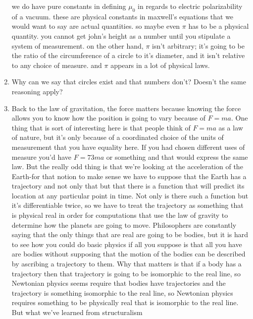 \documentclass[12pt]{article}
\theoremstyle{definition}
\begin{document}
\begin{enumerate}
        we do have pure constants in defining $\mu_0$ in regards to electric
        polarizability of a vacuum. these are physical constants in maxwell's
        equations that we would want to say are actual quantities. so maybe
        even $\pi$ has to be a physical quantity. you cannot get john's height
        as a number until you stipulate a system of measurement. on the other
        hand, $\pi$ isn't arbitrary; it's going to be the ratio of the
        circumference of a circle to it's diameter, and it isn't relative to any
        choice of measure. and $\pi$ appears in a lot of physical laws. 
    \item
        Why can we say that circles exist and that numbers don't? Doesn't the
        same reasoning apply?
    \item
        Back to the law of gravitation, the force matters because knowing the
        force allows you to know how the position is going to vary because of
        $F = ma$. One thing that is sort of interesting here is that people
        think of $F = ma$ as a law of nature, but it's only because of a
        coordinated choice of the units of measurement that you have equality
        here. If you had chosen different uses of measure you'd have $F = 73ma$
        or something and that would express the same law. But the really odd
        thing is that we're looking at the acceleration of the Earth-for that
        notion to make sense we have to suppose that the Earth has a trajectory
        and not only that but that there is a function that will predict its
        location at any particular point in time. Not only is there such a
        function but it's differentiable twice, so we have to treat the
        trajectory as something that is physical real in order for computations
        that use the law of gravity to determine how the planets are going to
        move. Philosophers are constantly saying that the only things that are
        real are going to be bodies, but it is hard to see how you could do
        basic physics if all you suppose is that all you have are bodies
        without supposing that the motion of the bodies can be described by
        ascribing a trajectory to them. Why that matters is that if a body has
        a trajectory then that trajectory is going to be isomorphic to the real
        line, so Newtonian physics seems require that bodies have trajectories
        and the trajectory is something isomorphic to the real line, so
        Newtonian physics requires something to be physically real that is
        isomorphic to the real line. But what we've learned from structuralism

\end{enumerate}
\end{document}
